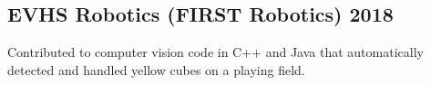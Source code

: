 \documentclass[../Resume.tex]{subfiles}
\begin{document}
    \subsection{EVHS Robotics (FIRST Robotics) \null\hfill 2018}
    \par Contributed to computer vision code in C++ and Java that automatically detected and handled yellow cubes on a playing field.
    \vspace*{-2mm}
\end{document}
